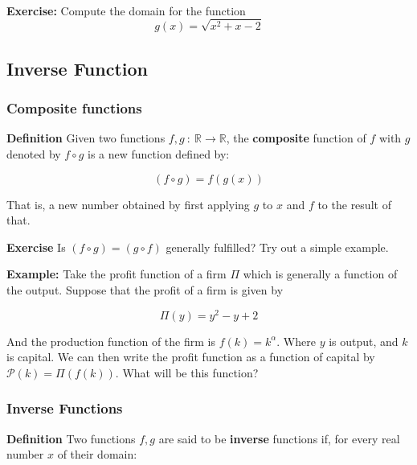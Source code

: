 \documentclass[11pt]{article}
\begin{document}
    \begin{center}
    \end{center}
    { \hspace*{\fill} \\}
    
    \textbf{Exercise:} Compute the domain for the function \[
g(x) = \sqrt{x^2 + x - 2}
\]

    \hypertarget{inverse-function}{%
\subsection{Inverse Function}\label{inverse-function}}

\hypertarget{composite-functions}{%
\subsubsection{Composite functions}\label{composite-functions}}

\textbf{Definition} Given two functions
\(f,g \ : \ \mathbb{R} \rightarrow \mathbb{R}\), the \textbf{composite}
function of \(f\) with \(g\) denoted by \(f\circ g\) is a new function
defined by:

\[
(f\circ g) = f(g(x))
\]

That is, a new number obtained by first applying \(g\) to \(x\) and
\(f\) to the result of that.

\textbf{Exercise} Is \((f\circ g) = (g \circ f)\) generally fulfilled?
Try out a simple example.

\textbf{Example:} Take the profit function of a firm \(\Pi\) which is
generally a function of the output. Suppose that the profit of a firm is
given by

\[
\Pi(y) = y^2 - y + 2
\]

And the production function of the firm is \(f(k) = k^{\alpha}\). Where
\(y\) is output, and \(k\) is capital. We can then write the profit
function as a function of capital by \(\mathcal{P}(k) = \Pi(f(k))\).
What will be this function?

\hypertarget{inverse-functions}{%
\subsubsection{Inverse Functions}\label{inverse-functions}}

\textbf{Definition} Two functions \(f, g\) are said to be
\textbf{inverse} functions if, for every real number \(x\) of their
domain:
\end{document}

